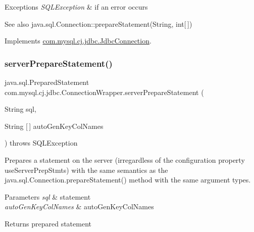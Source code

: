 \begin{DoxyExceptions}{Exceptions}
{\em S\+Q\+L\+Exception} & if an error occurs \\
\hline
\end{DoxyExceptions}
\begin{DoxySeeAlso}{See also}
java.\+sql.\+Connection\+::prepare\+Statement(\+String, int\mbox{[}$\,$\mbox{]}) 
\end{DoxySeeAlso}


Implements \mbox{\hyperlink{interfacecom_1_1mysql_1_1cj_1_1jdbc_1_1_jdbc_connection_aefdad3d71436ba1c80d2cb1e8419dfba}{com.\+mysql.\+cj.\+jdbc.\+Jdbc\+Connection}}.

\mbox{\label{classcom_1_1mysql_1_1cj_1_1jdbc_1_1_connection_wrapper_a02f353527ecf3306019227fa68d014a7}} 
\subsubsection{\texorpdfstring{server\+Prepare\+Statement()}{serverPrepareStatement()}\hspace{0.1cm}{\footnotesize\ttfamily [6/6]}}
{\footnotesize\ttfamily java.\+sql.\+Prepared\+Statement com.\+mysql.\+cj.\+jdbc.\+Connection\+Wrapper.\+server\+Prepare\+Statement (\begin{DoxyParamCaption}\item[{String}]{sql,  }\item[{String \mbox{[}$\,$\mbox{]}}]{auto\+Gen\+Key\+Col\+Names }\end{DoxyParamCaption}) throws S\+Q\+L\+Exception}

Prepares a statement on the server (irregardless of the configuration property \textquotesingle{}use\+Server\+Prep\+Stmts\textquotesingle{}) with the same semantics as the java.\+sql.\+Connection.\+prepare\+Statement() method with the same argument types.


\begin{DoxyParams}{Parameters}
{\em sql} & statement \\
\hline
{\em auto\+Gen\+Key\+Col\+Names} & auto\+Gen\+Key\+Col\+Names \\
\hline
\end{DoxyParams}
\begin{DoxyReturn}{Returns}
prepared statement 
\end{DoxyReturn}

